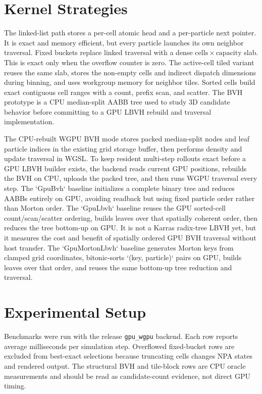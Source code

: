 \documentclass[10pt,twocolumn]{article}
\begin{document}
\section{Kernel Strategies}
The linked-list path stores a per-cell atomic head and a per-particle next
pointer. It is exact and memory efficient, but every particle launches its own
neighbor traversal. Fixed buckets replace linked traversal with a dense
\(\mathrm{cells}\times\mathrm{capacity}\) slab. This is exact only when the
overflow counter is zero. The active-cell tiled variant reuses the same slab,
stores the non-empty cells and indirect dispatch dimensions during binning, and
uses workgroup memory for neighbor tiles. Sorted cells build exact contiguous
cell ranges with a count, prefix scan, and scatter. The BVH prototype is a CPU
median-split AABB tree used to study 3D candidate behavior before committing to
a GPU LBVH rebuild and traversal implementation.

The CPU-rebuilt WGPU BVH mode stores packed median-split nodes and leaf particle
indices in the existing grid storage buffer, then performs density and update
traversal in WGSL. To keep resident multi-step rollouts exact before a GPU LBVH
builder exists, the backend reads current GPU positions, rebuilds the BVH on
CPU, uploads the packed tree, and then runs WGPU traversal every step. The
`GpuBvh` baseline initializes a complete binary tree and reduces AABBs entirely
on GPU, avoiding readback but using fixed particle order rather than Morton
order. The `GpuLbvh` baseline reuses the GPU sorted-cell count/scan/scatter
ordering, builds leaves over that spatially coherent order, then reduces the
tree bottom-up on GPU. It is not a Karras radix-tree LBVH yet, but it measures
the cost and benefit of spatially ordered GPU BVH traversal without host
transfer.
The `GpuMortonLbvh` baseline generates Morton keys from clamped grid
coordinates, bitonic-sorts `(key, particle)` pairs on GPU, builds leaves over
that order, and reuses the same bottom-up tree reduction and traversal.

\section{Experimental Setup}
Benchmarks were run with the release \texttt{gpu\_wgpu} backend. Each row
reports average milliseconds per simulation step. Overflowed fixed-bucket rows
are excluded from best-exact selections because truncating cells changes NPA
states and rendered output. The structural BVH and tile-block rows are CPU
oracle measurements and should be read as candidate-count evidence, not direct
GPU timing.
\end{document}
